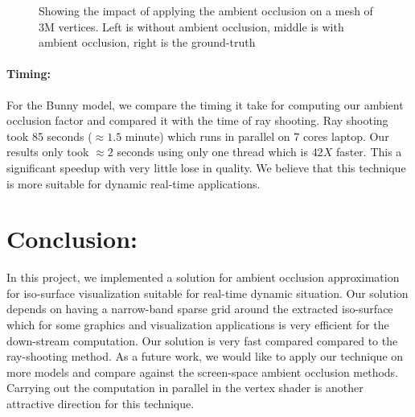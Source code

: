 \documentclass[a4paper,10pt]{article}
\begin{document}
\begin{figure}[!tbh]
\centering        
   \caption{Showing the impact of applying the ambient occlusion on a mesh of 3M vertices. Left is without ambient occlusion, middle is with ambient occlusion, right is the ground-truth}
   \label{fig:dragon_ao}
\end{figure}

\paragraph{Timing:}
For the Bunny model, we compare the timing it take for computing our ambient occlusion factor and compared it with the time of ray shooting. Ray shooting took 85 seconds ($\approx 1.5$ minute) which runs in parallel on 7 cores laptop. Our results only took $\approx 2$ seconds using only one thread which is $42X$ faster. This a significant speedup with very little lose in quality. We believe that this technique is more suitable for dynamic real-time applications. 


\section{Conclusion:}
In this project, we implemented a solution for ambient occlusion approximation for iso-surface visualization suitable for real-time dynamic situation. Our solution depends on having a narrow-band sparse grid around the extracted iso-surface which for some graphics and visualization applications is very efficient for the down-stream computation. Our solution is very fast compared compared to the ray-shooting method. As a future work, we would like to apply our technique on more models and compare against the screen-space ambient occlusion methods. Carrying out the computation in parallel in the vertex shader is another attractive direction for this technique. 
 
\medskip


\end{document}
